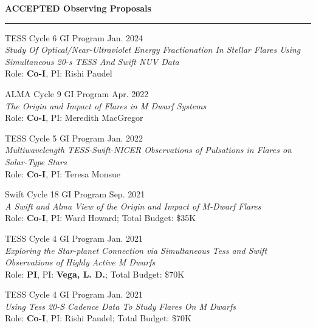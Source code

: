 \documentclass[letter,12pt]{article}
\begin{document}
\noindent
{\bf ACCEPTED Observing Proposals} \\
\vspace{-10mm}
\begin{center}
\rule{\textwidth}{0.2mm}
\end{center}
\vspace{-3mm}
\noindent
\begin{etaremune}
\renewcommand\labelenumi{\bfseries\theenumi .}

\item TESS Cycle 6 GI Program \hfill Jan. 2024 \\
\textit{Study Of Optical/Near-Ultraviolet Energy Fractionation In Stellar Flares Using Simultaneous 20-s TESS And Swift NUV Data} \\ Role: \textbf{Co-I}, PI: Rishi Paudel

\item ALMA Cycle 9 GI Program \hfill Apr. 2022 \\
\textit{The Origin and Impact of Flares in M Dwarf Systems} \\ Role: \textbf{Co-I}, PI: Meredith MacGregor

\item TESS Cycle 5 GI Program \hfill Jan. 2022 \\
\textit{Multiwavelength TESS-Swift-NICER Observations of Pulsations in Flares on Solar-Type Stars} \\ Role: \textbf{Co-I}, PI: Teresa Monsue

\item Swift Cycle 18 GI Program \hfill Sep. 2021 \\
\textit{A Swift and Alma View of the Origin and Impact of M-Dwarf Flares} \\ Role: \textbf{Co-I}, PI: Ward Howard; Total Budget: \$35K

\item TESS Cycle 4 GI Program \hfill Jan. 2021 \\
\textit{Exploring the Star-planet Connection via Simultaneous Tess and Swift Observations of Highly Active M Dwarfs} \\ Role: \textbf{PI}, PI: \textbf{Vega, L. D.}; Total Budget: \$70K

\item TESS Cycle 4 GI Program \hfill Jan. 2021 \\
\textit{Using Tess 20-S Cadence Data To Study Flares On M Dwarfs} \\ Role: \textbf{Co-I}, PI: Rishi Paudel; Total Budget: \$70K


\end{etaremune}
\end{document}
